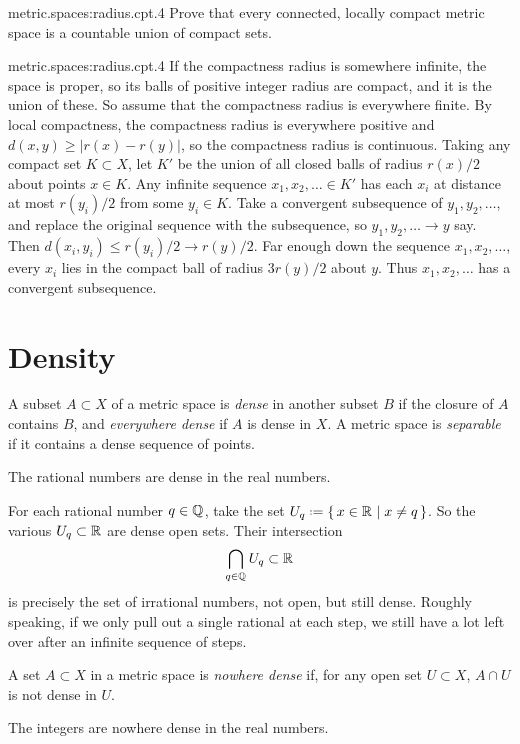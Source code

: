\begin{problem*}{metric.spaces:radius.cpt.4}
Prove that every connected, locally compact metric space is a countable union of compact sets.
\end{problem*}
\begin{answer}{metric.spaces:radius.cpt.4}
If the compactness radius is somewhere infinite, the space is proper, so its balls of positive integer radius are compact, and it is the union of these.
So assume that the compactness radius is everywhere finite.
By local compactness, the compactness radius is everywhere positive and \(d(x,y)\ge|r(x)-r(y)|\), so the compactness radius is continuous.
Taking any compact set \(K \subset X\), let \(K'\) be the union of all closed balls of radius \(r(x)/2\) about points \(x \in K\).
Any infinite sequence \(x_1,x_2,\dots \in K'\) has each \(x_i\) at distance at most \(r(y_i)/2\) from some \(y_i \in K\).
Take a convergent subsequence of \(y_1,y_2,\dots\), and replace the original sequence with the subsequence, so \(y_1,y_2,\dots \to y\) say.
Then \(d(x_i,y_i)\le r(y_i)/2 \to r(y)/2\).
Far enough down the sequence \(x_1,x_2,\dots\), every \(x_i\) lies in the compact ball of radius \(3r(y)/2\) about \(y\).
Thus \(x_1,x_2,\dots\) has a convergent subsequence.
\end{answer}

\section{Density}
A subset \(A \subset X\) of a metric space is \emph{dense} in another subset \(B\) if the closure of \(A\) contains \(B\), and \emph{everywhere dense} if \(A\) is dense in \(X\).
A metric space is \emph{separable} if it contains a dense sequence of points.
\begin{example}
The rational numbers are dense in the real numbers.
\end{example}
\begin{example}
For each rational number \(q \in \mathbb{Q}^{}\), take the set \(U_q \defeq \set{x \in \R{}|x \ne q}\).
So the various \(U_q \subset \mathbb{R}^{}\) are dense open sets.
Their intersection 
\[
\bigcap_{q \in \mathbb{Q}^{}} U_q \subset \mathbb{R}^{}
\]
is precisely the set of irrational numbers, not open, but still dense.
Roughly speaking, if we only pull out a single rational at each step, we still have a lot left over after an infinite sequence of steps.
\end{example}
A set \(A \subset X\) in a metric space is \emph{nowhere dense} if, for any open set \(U \subset X\), \(A \cap U\) is not dense in \(U\).
\begin{example}
The integers are nowhere dense in the real numbers.
\end{example}

